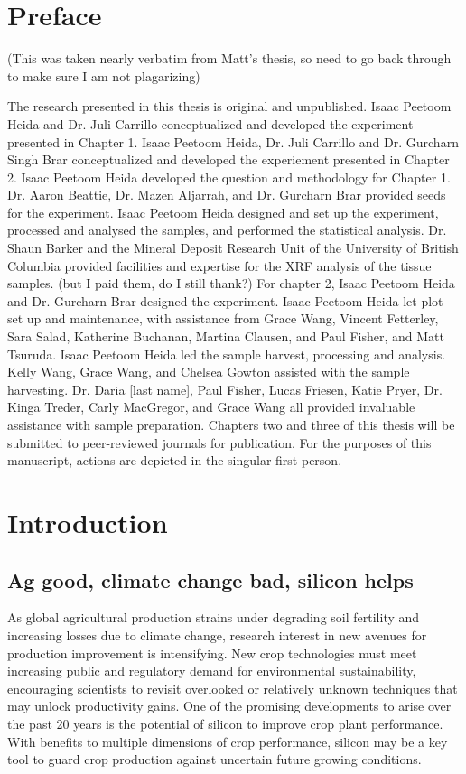 \documentclass[12pt, letterpaper, ]{article}
\begin{document}
\section*{Preface}
(This was taken nearly verbatim from Matt's thesis, so need to go back through to make sure I am not plagarizing)

The research presented in this thesis is original and unpublished. Isaac Peetoom Heida and Dr. Juli Carrillo conceptualized and developed the experiment presented in Chapter 1. Isaac Peetoom Heida, Dr. Juli Carrillo and Dr. Gurcharn Singh Brar conceptualized and developed the experiement presented in Chapter 2.
Isaac Peetoom Heida developed the question and methodology for Chapter 1. Dr. Aaron Beattie, Dr. Mazen Aljarrah, and Dr. Gurcharn Brar provided seeds for the experiment. Isaac Peetoom Heida designed and set up the experiment, processed and analysed the samples, and performed the statistical analysis. Dr. Shaun Barker and the Mineral Deposit Research Unit of the University of British Columbia provided facilities and expertise for the XRF analysis of the tissue samples. (but I paid them, do I still thank?)
For chapter 2, Isaac Peetoom Heida and Dr. Gurcharn Brar designed the experiment. Isaac Peetoom Heida let plot set up and maintenance, with assistance from Grace Wang, Vincent Fetterley, Sara Salad, Katherine Buchanan, Martina Clausen, and Paul Fisher, and Matt Tsuruda. Isaac Peetoom Heida led the sample harvest, processing and analysis. Kelly Wang, Grace Wang, and Chelsea Gowton assisted with the sample harvesting. Dr. Daria [last name], Paul Fisher, Lucas Friesen, Katie Pryer, Dr. Kinga Treder, Carly MacGregor, and Grace Wang all provided invaluable assistance with sample preparation. 
Chapters two and three of this thesis will be submitted to peer-reviewed journals for publication. For the purposes of this manuscript, actions are depicted in the singular first person. 
\section{Introduction}

\subsection{Ag good, climate change bad, silicon helps}

As global agricultural production strains under degrading soil fertility and increasing losses due to climate change, research interest in new avenues for production improvement is intensifying. New crop technologies must meet increasing public and regulatory demand for environmental sustainability, encouraging scientists to revisit overlooked or relatively unknown techniques that may unlock productivity gains. One of the promising developments to arise over the past 20 years is the potential of silicon to improve crop plant performance. With benefits to multiple dimensions of crop performance, silicon may be a key tool to guard crop production against uncertain future growing conditions. 
\end{document}
